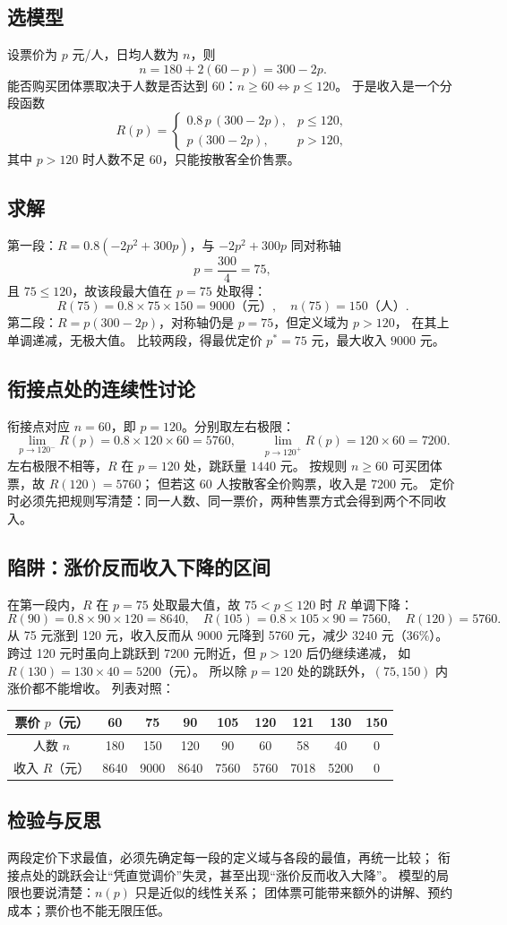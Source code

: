 \subsection{选模型}
设票价为 $p$ 元/人，日均人数为 $n$，则
\[
  n=180+2(60-p)=300-2p.
\]
能否购买团体票取决于人数是否达到 60：$n\ge60\iff p\le120$。
于是收入是一个分段函数
\[
  R(p)=\begin{cases}
    0.8\,p\,(300-2p), & p\le120,\\[2mm]
    p\,(300-2p), & p>120,
  \end{cases}
\]
其中 $p>120$ 时人数不足 60，只能按散客全价售票。

\subsection{求解}
第一段：$R=0.8(-2p^2+300p)$，与 $-2p^2+300p$ 同对称轴
\[
  p=\frac{300}{4}=75,
\]
且 $75\le120$，故该段最大值在 $p=75$ 处取得：
\[
  R(75)=0.8\times75\times150=9000\text{（元）},\quad n(75)=150\text{（人）}.
\]
第二段：$R=p(300-2p)$，对称轴仍是 $p=75$，但定义域为 $p>120$，
在其上单调递减，无极大值。
比较两段，得最优定价 $p^*=75$ 元，最大收入 $9000$ 元。

\subsection{衔接点处的连续性讨论}
衔接点对应 $n=60$，即 $p=120$。分别取左右极限：
\[
  \lim_{p\to120^-}R(p)=0.8\times120\times60=5760,\qquad
  \lim_{p\to120^+}R(p)=120\times60=7200.
\]
左右极限不相等，$R$ 在 $p=120$ 处，跳跃量 $1440$ 元。
按规则 $n\ge60$ 可买团体票，故 $R(120)=5760$；
但若这 60 人按散客全价购票，收入是 $7200$ 元。
定价时必须先把规则写清楚：同一人数、同一票价，两种售票方式会得到两个不同收入。

\subsection{陷阱：涨价反而收入下降的区间}
在第一段内，$R$ 在 $p=75$ 处取最大值，故 $75<p\le120$ 时 $R$ 单调下降：
\[
  R(90)=0.8\times90\times120=8640,\quad
  R(105)=0.8\times105\times90=7560,\quad
  R(120)=5760.
\]
从 75 元涨到 120 元，收入反而从 9000 元降到 5760 元，减少 $3240$ 元（$36\%$）。
跨过 120 元时虽向上跳跃到 $7200$ 元附近，但 $p>120$ 后仍继续递减，
如 $R(130)=130\times40=5200$（元）。
所以除 $p=120$ 处的跳跃外，$(75,150)$ 内涨价都不能增收。
列表对照：
\begin{center}
\footnotesize
\setlength{\tabcolsep}{6pt}
\renewcommand{\arraystretch}{1.3}
\begin{tabular}{ccccccccc}
\toprule
票价 $p$（元） & 60 & 75 & 90 & 105 & 120 & 121 & 130 & 150 \\
\midrule
人数 $n$ & 180 & 150 & 120 & 90 & 60 & 58 & 40 & 0 \\
收入 $R$（元） & 8640 & 9000 & 8640 & 7560 & 5760 & 7018 & 5200 & 0 \\
\bottomrule
\end{tabular}
\end{center}

\subsection{检验与反思}
两段定价下求最值，必须先确定每一段的定义域与各段的最值，再统一比较；
衔接点处的跳跃会让“凭直觉调价”失灵，甚至出现“涨价反而收入大降”。
模型的局限也要说清楚：$n(p)$ 只是近似的线性关系；
团体票可能带来额外的讲解、预约成本；票价也不能无限压低。
